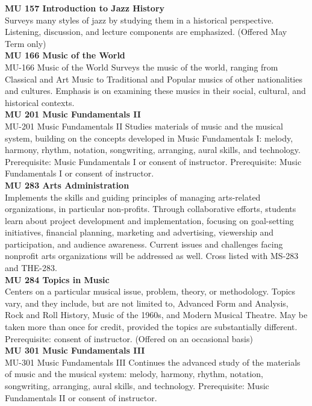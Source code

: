 \documentclass[
  letterpaper,
]{scrbook}
\begin{document}
\textbf{MU 157 Introduction to Jazz History}\\
Surveys many styles of jazz by studying them in a historical
perspective. Listening, discussion, and lecture components are
emphasized. (Offered May Term only)\\
\textbf{MU 166 Music of the World}\\
MU-166 Music of the World Surveys the music of the world, ranging from
Classical and Art Music to Traditional and Popular musics of other
nationalities and cultures. Emphasis is on examining these musics in
their social, cultural, and historical contexts.\\
\textbf{MU 201 Music Fundamentals II}\\
MU-201 Music Fundamentals II Studies materials of music and the musical
system, building on the concepts developed in Music Fundamentals I:
melody, harmony, rhythm, notation, songwriting, arranging, aural skills,
and technology. Prerequisite: Music Fundamentals I or consent of
instructor. Prerequisite: Music Fundamentals I or consent of
instructor.\\
\textbf{MU 283 Arts Administration}\\
Implements the skills and guiding principles of managing arts-related
organizations, in particular non-profits. Through collaborative efforts,
students learn about project development and implementation, focusing on
goal-setting initiatives, financial planning, marketing and advertising,
viewership and participation, and audience awareness. Current issues and
challenges facing nonprofit arts organizations will be addressed as
well. Cross listed with MS-283 and THE-283.\\
\textbf{MU 284 Topics in Music}\\
Centers on a particular musical issue, problem, theory, or methodology.
Topics vary, and they include, but are not limited to, Advanced Form and
Analysis, Rock and Roll History, Music of the 1960s, and Modern Musical
Theatre. May be taken more than once for credit, provided the topics are
substantially different. Prerequisite: consent of instructor. (Offered
on an occasional basis)\\
\textbf{MU 301 Music Fundamentals III}\\
MU-301 Music Fundamentals III Continues the advanced study of the
materials of music and the musical system: melody, harmony, rhythm,
notation, songwriting, arranging, aural skills, and technology.
Prerequisite: Music Fundamentals II or consent of instructor.\\
\end{document}
